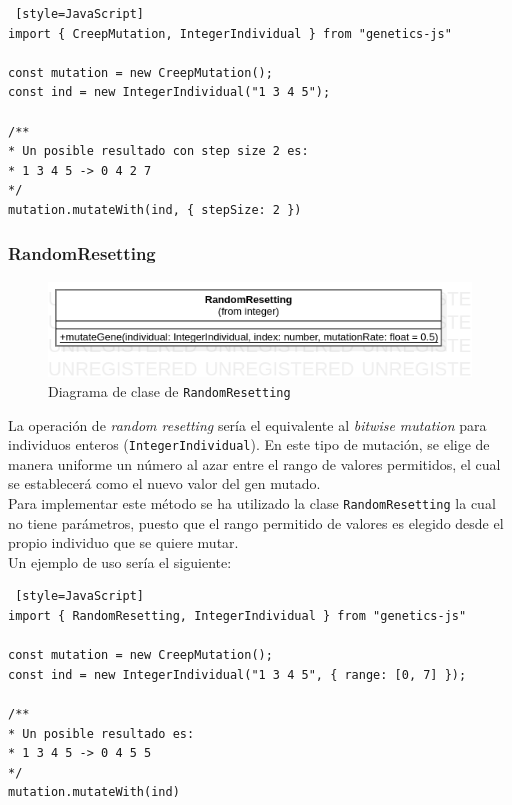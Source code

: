 \begin{lstlisting} [style=JavaScript]
import { CreepMutation, IntegerIndividual } from "genetics-js"

const mutation = new CreepMutation();
const ind = new IntegerIndividual("1 3 4 5");

/**
* Un posible resultado con step size 2 es:
* 1 3 4 5 -> 0 4 2 7
*/
mutation.mutateWith(ind, { stepSize: 2 })
\end{lstlisting}

\subsubsection{RandomResetting}

\begin{figure}[ht]
    \centering
    \includegraphics[scale=0.4]{mem/images/cap-4/4.2.7(Mutation)/RandomResetting.png}
    \caption{Diagrama de clase de \texttt{RandomResetting}}
    \label{fig:my_label}
\end{figure}

La operación de \textit{random resetting} sería el equivalente al \textit{bitwise mutation} para individuos enteros (\texttt{IntegerIndividual}). En este tipo de mutación, se elige de manera uniforme un número al azar entre el rango de valores permitidos, el cual se establecerá como el nuevo valor del gen mutado. \\

Para implementar este método se ha utilizado la clase \texttt{RandomResetting} la cual no tiene parámetros, puesto que el rango permitido de valores es elegido desde el propio individuo que se quiere mutar. \\

Un ejemplo de uso sería el siguiente: \\

\begin{lstlisting} [style=JavaScript]
import { RandomResetting, IntegerIndividual } from "genetics-js"

const mutation = new CreepMutation();
const ind = new IntegerIndividual("1 3 4 5", { range: [0, 7] });

/**
* Un posible resultado es:
* 1 3 4 5 -> 0 4 5 5
*/
mutation.mutateWith(ind)
\end{lstlisting}

